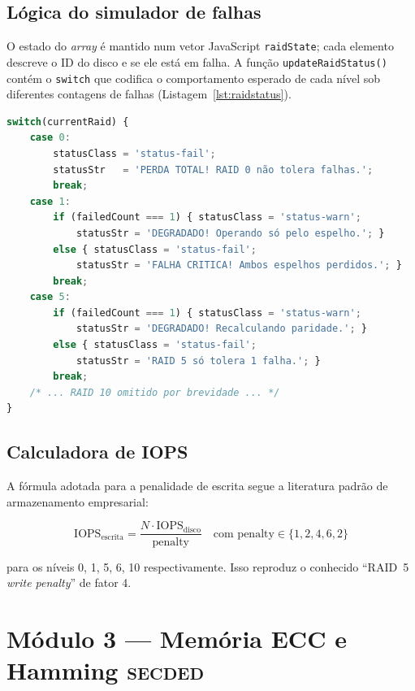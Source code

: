 \subsection{Lógica do simulador de falhas}

O estado do \emph{array} é mantido num vetor JavaScript
\texttt{raidState}; cada elemento descreve o ID do disco e se ele
está em falha. A função \texttt{updateRaidStatus()} contém o
\texttt{switch} que codifica o comportamento esperado de cada nível
sob diferentes contagens de falhas (Listagem~\ref{lst:raidstatus}).

\begin{lstlisting}[language=JavaScript,label=lst:raidstatus,caption=Trecho da lógica de status do RAID]
switch(currentRaid) {
    case 0:
        statusClass = 'status-fail';
        statusStr   = 'PERDA TOTAL! RAID 0 não tolera falhas.';
        break;
    case 1:
        if (failedCount === 1) { statusClass = 'status-warn';
            statusStr = 'DEGRADADO! Operando só pelo espelho.'; }
        else { statusClass = 'status-fail';
            statusStr = 'FALHA CRITICA! Ambos espelhos perdidos.'; }
        break;
    case 5:
        if (failedCount === 1) { statusClass = 'status-warn';
            statusStr = 'DEGRADADO! Recalculando paridade.'; }
        else { statusClass = 'status-fail';
            statusStr = 'RAID 5 só tolera 1 falha.'; }
        break;
    /* ... RAID 10 omitido por brevidade ... */
}
\end{lstlisting}

\subsection{Calculadora de IOPS}

A fórmula adotada para a penalidade de escrita segue a literatura
padrão de armazenamento empresarial:

\begin{equation}
\mathrm{IOPS}_{\text{escrita}} = \frac{N \cdot \mathrm{IOPS}_{\text{disco}}}{\text{penalty}}
\quad \text{com penalty} \in \{1, 2, 4, 6, 2\}
\end{equation}

para os níveis 0, 1, 5, 6, 10 respectivamente. Isso reproduz o
conhecido ``RAID~5 \emph{write penalty}'' de fator 4.

\section{Módulo 3 --- Memória ECC e Hamming \textsc{secded}}
\label{sec:mod3}


